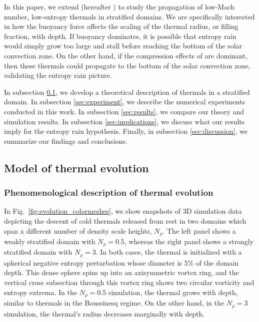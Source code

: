 In this paper, we extend \citet{lecoanet&jeevanjee2018} (hereafter \LJ) to study the propagation of low-Mach number, low-entropy thermals in stratified domains. 
We are specifically interested in how the buoyancy force affects the scaling of the thermal radius, or filling fraction, with depth. 
If buoyancy dominates, it is possible that entropy rain would simply grow too large and stall before reaching the bottom of the solar convection zone.
On the other hand, if the compression effects of \citet{brandenburg2016} are dominant, then these thermals could propagate to the bottom of the solar convection zone, validating the entropy rain picture.

In subsection \ref{sec:theory}, we develop a theoretical description of thermals in a stratified domain. 
In subsection \ref{sec:experiment}, we describe the numerical experiments conducted in this work. 
In subsection \ref{sec:results}, we compare our theory and simulation results. 
In subsection \ref{sec:implications}, we discuss what our results imply for the entropy rain hypothesis.
Finally, in subsection \ref{sec:discussion}, we summarize our findings and conclusions.

\subsection{Model of thermal evolution}
\label{sec:theory}

\subsubsection{Phenomenological description of thermal evolution}
In Fig.~\ref{fig:evolution_colormeshes}, we show snapshots of 3D simulation data depicting the descent of cold thermals released from rest in two domains which span a different number of density scale heights, $N_\rho$.
The left panel shows a weakly stratified domain with $N_\rho=0.5$, whereas the right panel shows a strongly stratified domain with $N_\rho=3$.
In both cases, the thermal is initialized with a spherical negative entropy perturbation whose diameter is 5\% of the domain depth.
This dense sphere spins up into an axisymmetric vortex ring, and the vertical cross subsection through this vortex ring shows two circular vorticity and entropy extrema.
In the $N_\rho = 0.5$ simulation, the thermal grows with depth, similar to thermals in the Boussinesq regime.
On the other hand, in the $N_\rho = 3$ simulation, the thermal's radius decreases marginally with depth.

